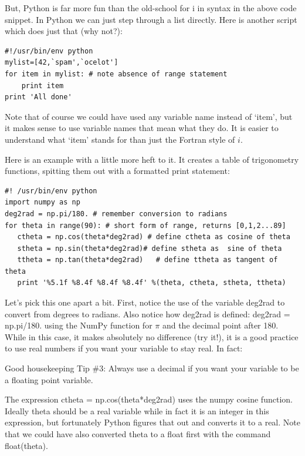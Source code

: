 \documentclass[11pt]{book}
\begin{document}
{{But, Python is far more fun than the old-school {\color{blue}for i in} syntax in the above code snippet.  In Python we can just step through a list directly.  Here is another  script which does just that (why not?):

{ \color{blue} \begin{verbatim}
#!/usr/bin/env python
mylist=[42,`spam',`ocelot']
for item in mylist: # note absence of range statement
    print item
print 'All done'
\end{verbatim}}

\noindent Note that of course we could have used any variable name instead of `item', but it makes sense to use variable names that mean what they do.  It is easier to understand what `item' stands for than just the Fortran style of $i$.

Here is an example with a little more heft to it.  It creates a table of trigonometry functions, spitting them out with a formatted print statement:

{ \color{blue} \begin{verbatim}
#! /usr/bin/env python
import numpy as np
deg2rad = np.pi/180. # remember conversion to radians
for theta in range(90): # short form of range, returns [0,1,2...89]
   ctheta = np.cos(theta*deg2rad) # define ctheta as cosine of theta
   stheta = np.sin(theta*deg2rad)# define stheta as  sine of theta
   ttheta = np.tan(theta*deg2rad)   # define ttheta as tangent of theta
   print '%5.1f %8.4f %8.4f %8.4f' %(theta, ctheta, stheta, ttheta)
 \end{verbatim}}

 Let's pick this one apart a bit.  First,
notice the use of the variable {\color{blue}deg2rad} to convert from degrees to radians.  Also notice how deg2rad is defined: {\color{blue}deg2rad = np.pi/180.} using the {\color{blue}NumPy} function for $\pi$ and the decimal point after 180.  While in this case, it makes absolutely no difference (try it!), it is a good practice to use real numbers if you want your variable to stay real.  In fact:

{\color{magenta}Good housekeeping Tip \#3:  Always use a decimal if you want your variable to be a floating point variable.}

The expression {\color{blue} ctheta = np.cos(theta*deg2rad)} uses the {\color{blue}numpy} cosine function. Ideally {\color{blue} theta} should be a real variable while in fact it is an integer
  in this expression, but fortunately Python figures that out and converts it to a real.   Note that we could have also converted theta to a float first with the command {\color{blue}float(theta)}.

}}
\end{document}
